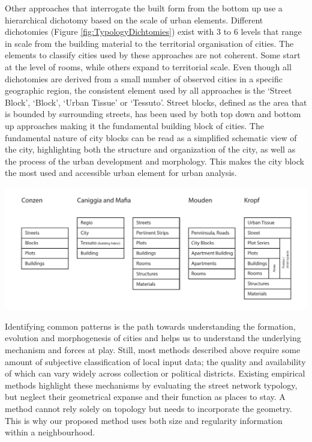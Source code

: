 \documentclass{nature}
\makeatletter
\renewenvironment*{figure}{\@float{figure}}{\end@float}
\makeatother
\begin{document}
Other approaches that interrogate the built form from the bottom up use a hierarchical dichotomy based on the scale of urban elements. Different dichotomies (Figure \ref{fig:TypologyDichtomies}) exist with 3 to 6 levels that range in scale from the building material to the territorial organisation of cities\cite{Lynch1981,Conzen1960,Caniggi1979,Castex1980,Mouden1988,Allain2004}. The elements  to classify cities used by these approaches are not coherent. Some start at the level of rooms, while others expand to territorial scale. Even though all dichotomies are derived from a small number of observed cities in a specific geographic region, the consistent element used by all approaches is the `Street Block', `Block', `Urban Tissue' or `Tessuto'. Street blocks, defined as the area that is bounded by surrounding streets, has been used by both top down and bottom up approaches making it the fundamental building block of cities. The fundamental nature of city blocks can be read as a simplified schematic view of the city\cite{Southworth2013}, highlighting both the structure and organization of the city, as well as the process of the urban development and morphology. This makes the city block the most used and accessible urban element for urban analysis.  

\begin{figure}
\centering    
\includegraphics[scale=0.80,page=1]{Images/Typology_Dichtomies.pdf}  
\caption{\bf Different scales of dichotomies. }    
 \label{fig:TypologyDichtomies}  
\end{figure} 

Identifying common patterns is the path towards understanding the formation, evolution and morphogenesis of cities and helps us to understand the underlying mechanism and forces at play. Still, most methods described above require some amount of subjective classification of local input data; the quality and availability of which can vary widely across collection or political districts. Existing empirical methods highlight these mechanisms by evaluating the street network typology\cite{Hillier1989}, but neglect their geometrical expanse and their function as places to stay. A method cannot rely solely on topology but needs to incorporate the geometry\cite{Louf2014a}. This is why our proposed method uses both size and regularity information within a neighbourhood.  
\end{document}
